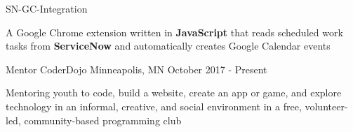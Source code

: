 \documentclass[]{awesome-cv}
\begin{document}
\begin{cventries}
	\cventry
	{}
	{SN-GC-Integration}
	{}
	{}
	{\begin{cvitems}
		\vspace{-4mm}
		\item {A Google Chrome extension written in \textbf{JavaScript} that reads scheduled work tasks from \textbf{ServiceNow} and automatically creates Google Calendar events}
		\end{cvitems}}
\end{cventries}

\vspace{-2mm}
\begin{cventries}
	\cventry
	{Mentor}
	{CoderDojo}
	{Minneapolis, MN}
	{October 2017 - Present}
	{\begin{cvitems}
		\item {Mentoring youth to code, build a website, create an app or game, and explore technology in an informal, creative, and social environment in a free, volunteer-led, community-based programming club}
		\end{cvitems}}
\end{cventries}
\end{document}
